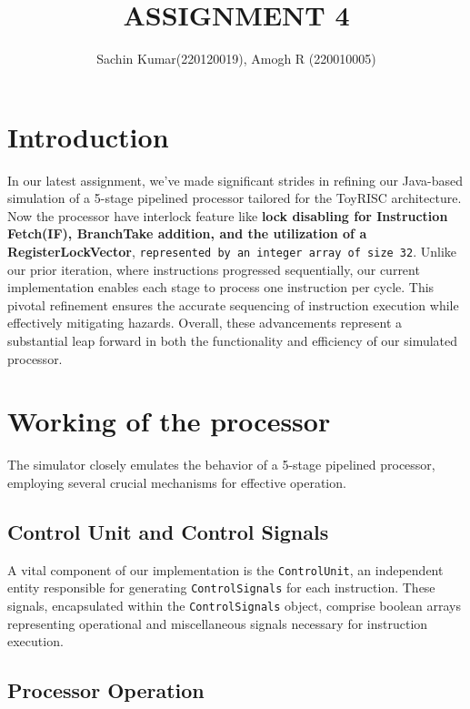 \documentclass[12pt,a4paper]{article}
\title{\textbf{ASSIGNMENT 4}}
\author{Sachin Kumar(220120019), Amogh R (220010005)}
\date{}
\begin{document}
\maketitle

\section{Introduction}\label{sec:intro}

In our latest assignment, we've made significant strides in refining our Java-based simulation of a 5-stage pipelined processor tailored for the ToyRISC architecture. \\
 \quad Now the processor have interlock feature like  \textbf{lock disabling for Instruction Fetch(IF), BranchTake addition, and the utilization of a RegisterLockVector}, \texttt{represented by an integer array of size 32}. Unlike our prior iteration, where instructions progressed sequentially, our current implementation enables each stage to process one instruction per cycle. This pivotal refinement ensures the accurate sequencing of instruction execution while effectively mitigating hazards. Overall, these advancements represent a substantial leap forward in both the functionality and efficiency of our simulated processor.


\section{Working of the processor}

The simulator closely emulates the behavior of a 5-stage pipelined processor, employing several crucial mechanisms for effective operation.

\subsection{Control Unit and Control Signals}

A vital component of our implementation is the \texttt{ControlUnit}, an independent entity responsible for generating \texttt{ControlSignals} for each instruction. These signals, encapsulated within the \texttt{ControlSignals} object, comprise boolean arrays representing operational and miscellaneous signals necessary for instruction execution.

\subsection{Processor Operation}
\end{document}
